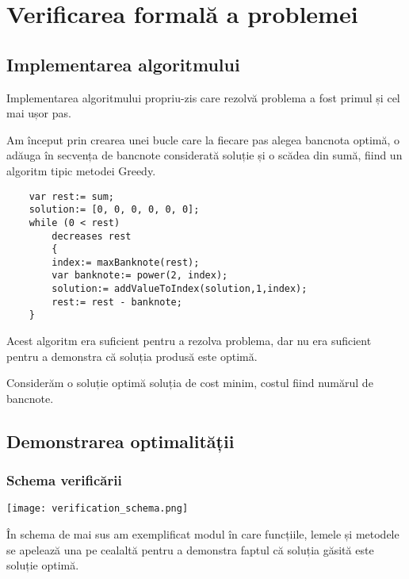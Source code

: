 

\chapter{Verificarea formală a problemei}

\section{Implementarea algoritmului}
    Implementarea algoritmului propriu-zis care rezolvă problema a fost primul și cel mai ușor pas.\par
    Am început prin crearea unei bucle care la fiecare pas alegea bancnota optimă, o adăuga în secvența de 
    bancnote considerată soluție și o scădea din sumă, fiind un algoritm tipic metodei Greedy.
    \begin{lstlisting}
    var rest:= sum;
    solution:= [0, 0, 0, 0, 0, 0];
    while (0 < rest)
        decreases rest 
        {
        index:= maxBanknote(rest);
        var banknote:= power(2, index);
        solution:= addValueToIndex(solution,1,index);
        rest:= rest - banknote;
    }
    \end{lstlisting}

    Acest algoritm era suficient pentru a rezolva problema, dar nu era suficient pentru a demonstra că soluția produsă este optimă.\par
    Considerăm o soluție optimă soluția de cost minim, costul fiind numărul de bancnote.
    
\section{Demonstrarea optimalității}
    \subsection{Schema verificării}
    \vspace{1cm}
    \begin{center}
        \texttt{[image: verification\_schema.png]}\par
    \end{center}
    În schema de mai sus am exemplificat modul în care funcțiile, lemele și metodele se apelează una pe cealaltă pentru a demonstra faptul că soluția găsită este soluție optimă.\par

